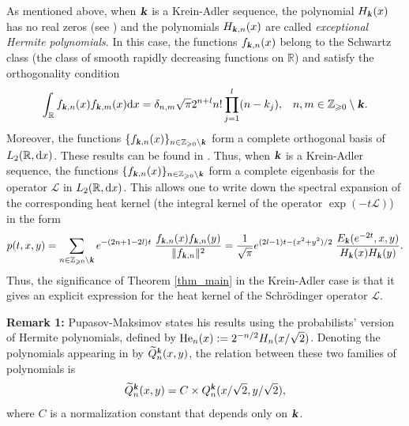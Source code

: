 \documentclass[12pt]{article}
\def\r{{\mathbb R}}
\def\d{{\textnormal d}}
\def\k{\textbf{\textsl{k}}}
\begin{document}
As mentioned above, when $\k$ is a Krein-Adler sequence, the polynomial $H_{\k}(x)$ has no real zeros (see \cite[Theorem 4.2]{Gomez-Ullate_2014}) and the polynomials $H_{\k,n}(x)$ are called {\it exceptional Hermite polynomials}.  In this case, the functions $f_{\k,n}(x)$ belong to the Schwartz class (the class of smooth rapidly decreasing functions on $\r$) and satisfy the orthogonality condition
\begin{equation*}
\int_{\r} f_{\k,n}(x) f_{\k,m}(x) \d x= \delta_{n,m} \sqrt{\pi} 2^{n+l} n!  \prod_{j=1}^l (n-k_j), \;\;\; n,m \in {\mathbb Z}_{\geqslant 0} \setminus \k.
\end{equation*}
Moreover, the functions $\{f_{\k,n}(x)\}_{n \in {\mathbb Z}_{\geqslant 0} \setminus \k}$ form a complete orthogonal basis of $L_2(\r, \d x)$. These results can be found in \cite{Gomez-Ullate_2014,Gomez2016}. Thus, when $\k$ is a Krein-Adler sequence, the functions $\{f_{\k,n}(x)\}_{n \in {\mathbb Z}_{\geqslant 0} \setminus \k}$ form a complete eigenbasis for the operator ${\mathcal L}$ in $L_2(\r, \d x)$. This allows one to write down the spectral expansion of the corresponding heat kernel \cite{Avramidi2015,Vassilevich2003} (the integral kernel of the operator $\exp(-t {\mathcal L})$) in the form
\begin{equation}\label{L_heat_kernel}
p(t,x,y)=\sum\limits_{n \in {\mathbb Z}_{\geqslant 0} \setminus \k} 
e^{-(2n+1-2l) t} \; \frac{f_{\k,n}(x) f_{\k,n}(y)}{\lVert f_{\k,n} \rVert^2}=\frac{1}{\sqrt{\pi}} e^{(2l-1)t-(x^2+y^2)/2}
\;\frac{E_{\k}(e^{-2t},x,y)}{H_{\k}(x) H_{\k}(y)}. 
\end{equation}
Thus, the significance of Theorem \ref{thm_main} in the Krein-Adler case is that it gives an explicit expression for the heat kernel of the Schr\"odinger operator ${\mathcal L}$. 





\vspace{0.15cm}
\noindent
{\bf Remark 1:} Pupasov-Maksimov \cite{Pupasov_2015} states his results using the probabilists' version of Hermite polynomials, defined by ${\textnormal{He}}_n(x):=2^{-n/2} H_n(x/\sqrt{2})$. Denoting the polynomials appearing in \cite{Pupasov_2015} by $\widetilde Q_n^{\k}(x,y)$,  the relation between these two families of polynomials is  
\[
\widetilde Q_n^{\k}(x,y)=C \times  Q_n^{\k}(x/\sqrt{2}, y/\sqrt{2} ),
\]
where $C$ is a normalization constant that depends only on $\k$. 
\vspace{0.15cm}
\end{document}

